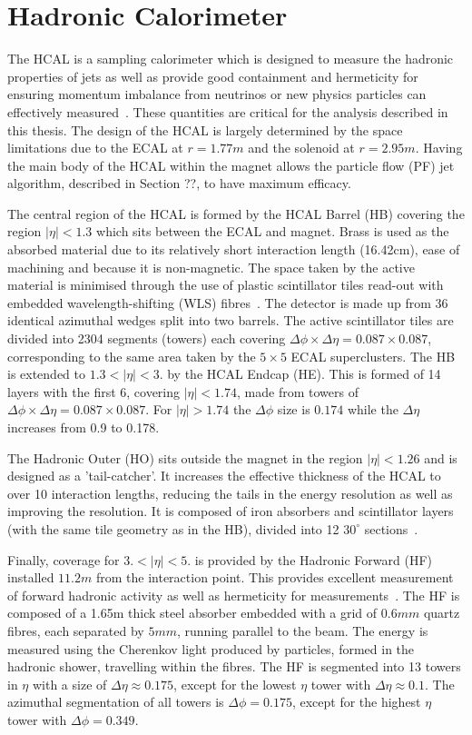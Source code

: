 \section{Hadronic Calorimeter}

The HCAL is a sampling calorimeter which is designed to measure the hadronic properties of jets as well as provide good 
containment and hermeticity for ensuring momentum imbalance from neutrinos or new physics particles can effectively measured~\cite{hcal_tdr}.
These quantities are critical for the analysis described in this thesis.
The design of the HCAL is largely determined by the space limitations due to the ECAL at $r = 1.77 m$ and the solenoid at $r = 2.95 m$.
Having the main body of the HCAL within the magnet allows the particle flow (PF) jet algorithm, described in Section ??, to have maximum 
efficacy. 

The central region of the HCAL is formed by the HCAL Barrel (HB) covering the region $|\eta| < 1.3$ which sits between
the ECAL and magnet. Brass is used as the absorbed material due to its relatively short interaction length (16.42cm), ease of machining 
and because it is non-magnetic. The space taken by the active material is minimised through the use of plastic scintillator tiles
read-out with embedded wavelength-shifting (WLS) fibres~\cite{CMS}. The detector is made up from 36 identical azimuthal wedges split into two barrels.
The active scintillator tiles are divided into 2304 segments (towers) each covering $\Delta\phi \times \Delta\eta = 0.087 × 0.087$, corresponding to the 
same area taken by the $5\times5$ ECAL superclusters. The HB is extended to $ 1.3 < |\eta| < 3.$ by the HCAL Endcap (HE). This is formed of 14 layers 
with the first 6, covering  $|\eta| < 1.74$, made from towers of $\Delta\phi \times \Delta\eta = 0.087 × 0.087$. For $|\eta| > 1.74$ the $\Delta\phi$
size is $0.174$ while the $\Delta\eta$ increases from 0.9 to 0.178.

The Hadronic Outer (HO) sits outside the magnet in the region $|\eta| < 1.26$ and is designed as a 'tail-catcher'.
It increases the effective thickness of the HCAL to over 10 interaction lengths, reducing the tails in the energy resolution
as well as improving the \met resolution. It is composed of iron absorbers and scintillator layers (with the same tile geometry as in the HB), divided into 
12 $30^\circ$ sections~\cite{hcal_tdr}. 

Finally, coverage for $3. < |\eta| < 5.$ is provided by the Hadronic Forward (HF) installed $11.2 m$ from the interaction point. This provides
excellent measurement of forward hadronic activity as well as hermeticity for \met measurements~\cite{hcal_tdr}. The HF is composed of a 1.65m thick steel absorber 
embedded with a grid of $0.6 mm$ quartz fibres, each separated by $5mm$, running parallel to the beam. The energy is measured using the Cherenkov
light produced by particles, formed in the hadronic shower, travelling within the fibres. The HF is segmented into 13 towers in $\eta$ with a
size of $\Delta\eta \approx 0.175$, except for the lowest $\eta$ tower with $\Delta\eta \approx 0.1$. The azimuthal segmentation of all towers is 
$\Delta\phi = 0.175$, except for the highest $\eta$ tower with $\Delta\phi = 0.349$.

